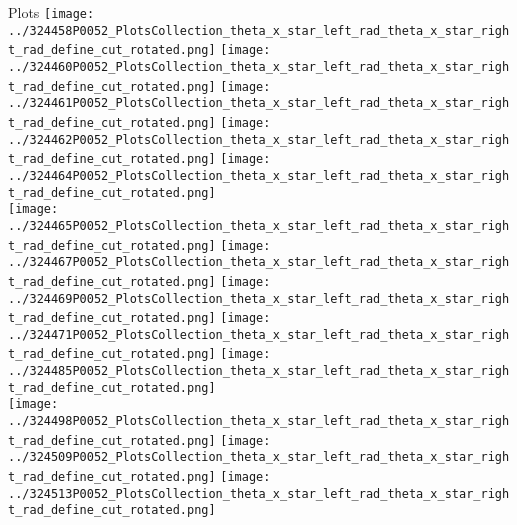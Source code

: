 \documentclass{beamer}
\begin{document}
\begin{frame}\tiny
        \begin{block}{Plots}
		  \centering
                \texttt{[image: ../324458P0052\_PlotsCollection\_theta\_x\_star\_left\_rad\_theta\_x\_star\_right\_rad\_define\_cut\_rotated.png]}
                \texttt{[image: ../324460P0052\_PlotsCollection\_theta\_x\_star\_left\_rad\_theta\_x\_star\_right\_rad\_define\_cut\_rotated.png]}
                \texttt{[image: ../324461P0052\_PlotsCollection\_theta\_x\_star\_left\_rad\_theta\_x\_star\_right\_rad\_define\_cut\_rotated.png]}
                \texttt{[image: ../324462P0052\_PlotsCollection\_theta\_x\_star\_left\_rad\_theta\_x\_star\_right\_rad\_define\_cut\_rotated.png]}
                \texttt{[image: ../324464P0052\_PlotsCollection\_theta\_x\_star\_left\_rad\_theta\_x\_star\_right\_rad\_define\_cut\_rotated.png]}\\
                \texttt{[image: ../324465P0052\_PlotsCollection\_theta\_x\_star\_left\_rad\_theta\_x\_star\_right\_rad\_define\_cut\_rotated.png]}
                \texttt{[image: ../324467P0052\_PlotsCollection\_theta\_x\_star\_left\_rad\_theta\_x\_star\_right\_rad\_define\_cut\_rotated.png]}
                \texttt{[image: ../324469P0052\_PlotsCollection\_theta\_x\_star\_left\_rad\_theta\_x\_star\_right\_rad\_define\_cut\_rotated.png]}
                \texttt{[image: ../324471P0052\_PlotsCollection\_theta\_x\_star\_left\_rad\_theta\_x\_star\_right\_rad\_define\_cut\_rotated.png]}
                \texttt{[image: ../324485P0052\_PlotsCollection\_theta\_x\_star\_left\_rad\_theta\_x\_star\_right\_rad\_define\_cut\_rotated.png]}\\
                \texttt{[image: ../324498P0052\_PlotsCollection\_theta\_x\_star\_left\_rad\_theta\_x\_star\_right\_rad\_define\_cut\_rotated.png]}
                \texttt{[image: ../324509P0052\_PlotsCollection\_theta\_x\_star\_left\_rad\_theta\_x\_star\_right\_rad\_define\_cut\_rotated.png]}
                \texttt{[image: ../324513P0052\_PlotsCollection\_theta\_x\_star\_left\_rad\_theta\_x\_star\_right\_rad\_define\_cut\_rotated.png]}

\end{block}
\end{frame}
\end{document}
